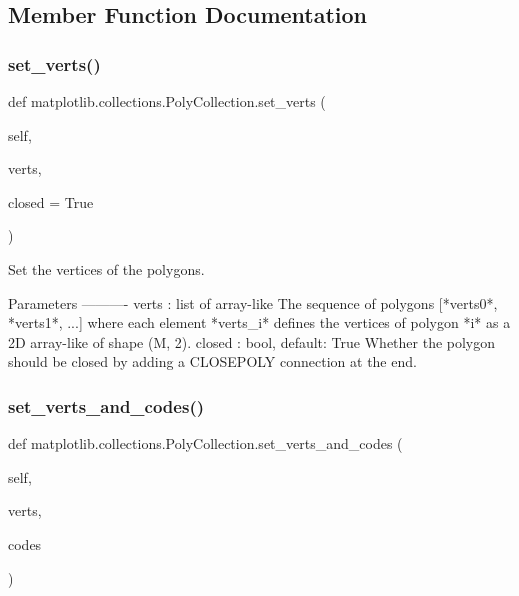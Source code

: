 \subsection{Member Function Documentation}
\mbox{\label{classmatplotlib_1_1collections_1_1PolyCollection_ada06fb0a14e12f529a52badcfd9f1d1b}} 
\subsubsection{\texorpdfstring{set\+\_\+verts()}{set\_verts()}}
{\footnotesize\ttfamily def matplotlib.\+collections.\+Poly\+Collection.\+set\+\_\+verts (\begin{DoxyParamCaption}\item[{}]{self,  }\item[{}]{verts,  }\item[{}]{closed = {\ttfamily True} }\end{DoxyParamCaption})}

\begin{DoxyVerb}Set the vertices of the polygons.

Parameters
----------
verts : list of array-like
    The sequence of polygons [*verts0*, *verts1*, ...] where each
    element *verts_i* defines the vertices of polygon *i* as a 2D
    array-like of shape (M, 2).
closed : bool, default: True
    Whether the polygon should be closed by adding a CLOSEPOLY
    connection at the end.
\end{DoxyVerb}
 \mbox{\label{classmatplotlib_1_1collections_1_1PolyCollection_a8a245825bf8c8b709bc14f08d2bce8f5}} 
\subsubsection{\texorpdfstring{set\+\_\+verts\+\_\+and\+\_\+codes()}{set\_verts\_and\_codes()}}
{\footnotesize\ttfamily def matplotlib.\+collections.\+Poly\+Collection.\+set\+\_\+verts\+\_\+and\+\_\+codes (\begin{DoxyParamCaption}\item[{}]{self,  }\item[{}]{verts,  }\item[{}]{codes }\end{DoxyParamCaption})}

